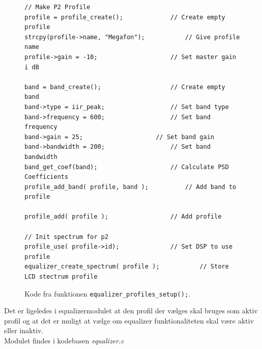 \begin{figure}[h!]
\centering	
{}
\begin{lstlisting}
// Make P2 Profile
profile = profile_create();				// Create empty profile
strcpy(profile->name, "Megafon");			// Give profile name
profile->gain = -10;					// Set master gain i dB

band = band_create();					// Create empty band
band->type = iir_peak;					// Set band type
band->frequency = 600;					// Set band frequency
band->gain = 25;					// Set band gain
band->bandwidth = 200;					// Set band bandwidth
band_get_coef(band);					// Calculate PSD Coefficients
profile_add_band( profile, band );			// Add band to profile

profile_add( profile );					// Add profile

// Init spectrum for p2
profile_use( profile->id);				// Set DSP to use profile
equalizer_create_spectrum( profile );			// Store LCD stectrum profile
\end{lstlisting}
\caption{Kode fra funktionen \texttt{equalizer\_profiles\_setup();}.}
\label{lst:eq_profil_setup}
\end{figure}

Det er ligeledes i equalizermodulet at den profil der vælges skal bruges som aktiv profil og at det er muligt at vælge om equalizer funktionaliteten skal være aktiv eller inaktiv.\\

Modulet findes i kodebasen \textit{equalizer.c}


  




